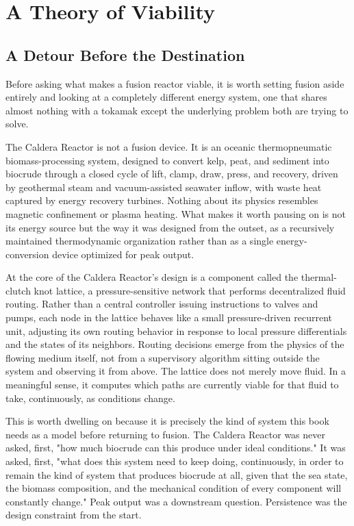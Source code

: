 \chapter{A Theory of Viability}

\section{A Detour Before the Destination}

Before asking what makes a fusion reactor viable, it is worth setting fusion aside entirely and looking at a completely different energy system, one that shares almost nothing with a tokamak except the underlying problem both are trying to solve.

The Caldera Reactor is not a fusion device. It is an oceanic thermopneumatic biomass-processing system, designed to convert kelp, peat, and sediment into biocrude through a closed cycle of lift, clamp, draw, press, and recovery, driven by geothermal steam and vacuum-assisted seawater inflow, with waste heat captured by energy recovery turbines. Nothing about its physics resembles magnetic confinement or plasma heating. What makes it worth pausing on is not its energy source but the way it was designed from the outset, as a recursively maintained thermodynamic organization rather than as a single energy-conversion device optimized for peak output.

At the core of the Caldera Reactor's design is a component called the thermal-clutch knot lattice, a pressure-sensitive network that performs decentralized fluid routing. Rather than a central controller issuing instructions to valves and pumps, each node in the lattice behaves like a small pressure-driven recurrent unit, adjusting its own routing behavior in response to local pressure differentials and the states of its neighbors. Routing decisions emerge from the physics of the flowing medium itself, not from a supervisory algorithm sitting outside the system and observing it from above. The lattice does not merely move fluid. In a meaningful sense, it computes which paths are currently viable for that fluid to take, continuously, as conditions change.

This is worth dwelling on because it is precisely the kind of system this book needs as a model before returning to fusion. The Caldera Reactor was never asked, first, "how much biocrude can this produce under ideal conditions." It was asked, first, "what does this system need to keep doing, continuously, in order to remain the kind of system that produces biocrude at all, given that the sea state, the biomass composition, and the mechanical condition of every component will constantly change." Peak output was a downstream question. Persistence was the design constraint from the start.

